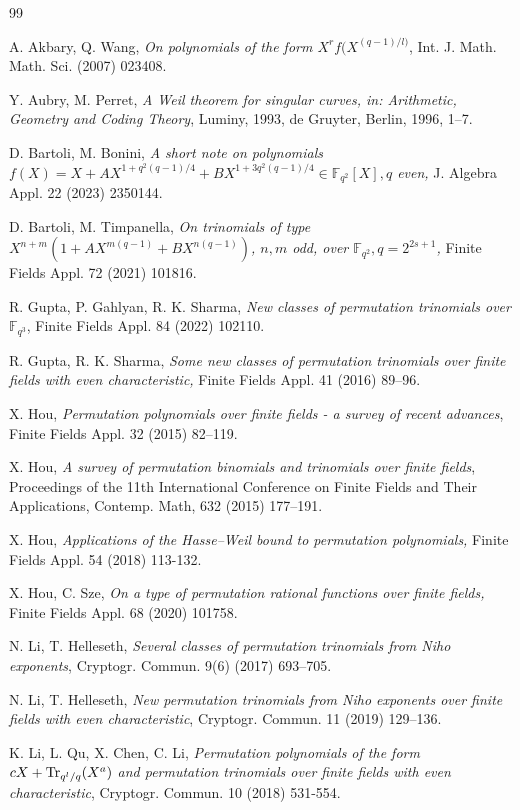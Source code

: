 \documentclass[12pt,reqno]{amsart}
\numberwithin{equation}{section}
\theoremstyle{definition}
\newcommand{\F}{\mathbb F}
\def\Tr{{\rm Tr}}
\begin{document}
\begin{thebibliography}{99}

A. Akbary, Q. Wang, {\it On polynomials of the form $X^r f(X^{(q-1)/l)}$}, Int. J. Math. Math. Sci. (2007) 023408.

 Y. Aubry, M. Perret, {\it A Weil theorem for singular curves, in: Arithmetic, Geometry and Coding Theory}, Luminy, 1993, de Gruyter, Berlin, 1996, 1--7.

 D. Bartoli, M. Bonini, {\it A short note on polynomials $f(X)= X+ AX^{1+ q^2(q-1)/4}+ BX^{1+ 3q^2(q-1)/4} \in  \F_{q^2}[X], q$ even,} J. Algebra Appl. 22 (2023) 2350144.

 D. Bartoli, M. Timpanella, {\it On trinomials of type $X^{n+ m} (1+ AX^{m (q-1)}+ BX^{n (q-1)})$, $n, m$ odd, over $\F_{q^2}, q= 2^{2s+1}$,} Finite Fields Appl. 72 (2021) 101816.

R. Gupta, P. Gahlyan, R. K. Sharma, \textit{New classes of permutation trinomials over $\mathbb{F}_{q^3}$}, Finite Fields Appl. 84 (2022) 102110.	

 R. Gupta, R. K. Sharma, {\it Some new classes of permutation trinomials over finite fields with even characteristic,} Finite Fields Appl. 41 (2016) 89--96.
	
X. Hou, {\it Permutation polynomials over finite fields - a survey of recent advances}, Finite Fields Appl. 32 (2015) 82--119.

X. Hou, \textit{A survey of permutation binomials and trinomials over finite fields}, Proceedings of the 11th International Conference on Finite Fields and Their Applications, Contemp. Math, 632 (2015) 177--191.

 X. Hou, {\it Applications of the Hasse–Weil bound to permutation polynomials,} Finite Fields Appl. 54 (2018) 113-132.

 X. Hou, C. Sze, {\it On a type of permutation rational functions over finite fields,} Finite Fields Appl. 68 (2020) 101758.

 N. Li, T. Helleseth, \textit{Several classes of permutation trinomials from Niho exponents}, Cryptogr. Commun. 9(6) (2017) 693–705.

 N. Li, T. Helleseth, \textit{New permutation trinomials from Niho exponents over finite fields with even characteristic}, Cryptogr. Commun. 11 (2019) 129–136.

K. Li, L. Qu, X. Chen, C.  Li, \textit{Permutation polynomials of the form $cX+ \Tr _{q^l/q}(X^a)$ and permutation trinomials over finite fields with even characteristic}, Cryptogr. Commun. 10 (2018) 531-554.


\end{thebibliography}
\end{document}
